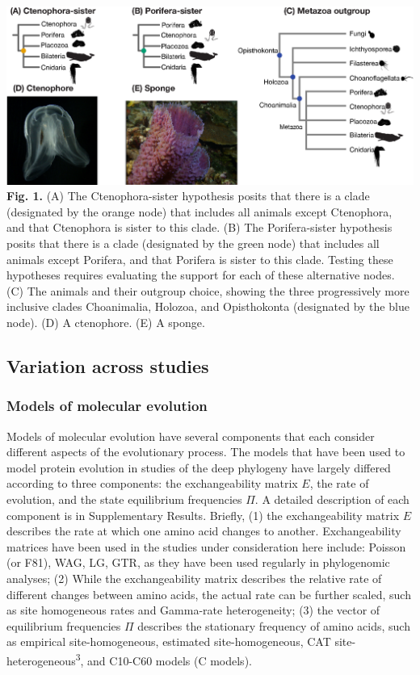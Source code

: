 \documentclass[]{article}
\begin{document}
\includegraphics{figures/Figure_overview.png} \textbf{Fig. 1.} (A) The
Ctenophora-sister hypothesis posits that there is a clade (designated by
the orange node) that includes all animals except Ctenophora, and that
Ctenophora is sister to this clade. (B) The Porifera-sister hypothesis
posits that there is a clade (designated by the green node) that
includes all animals except Porifera, and that Porifera is sister to
this clade. Testing these hypotheses requires evaluating the support for
each of these alternative nodes. (C) The animals and their outgroup
choice, showing the three progressively more inclusive clades
Choanimalia, Holozoa, and Opisthokonta (designated by the blue node).
(D) A ctenophore. (E) A sponge.

\hypertarget{variation-across-studies}{%
\subsection{Variation across studies}\label{variation-across-studies}}

\hypertarget{models-of-molecular-evolution}{%
\subsubsection{Models of molecular
evolution}\label{models-of-molecular-evolution}}

Models of molecular evolution have several components that each consider
different aspects of the evolutionary process. The models that have been
used to model protein evolution in studies of the deep phylogeny have
largely differed according to three components: the exchangeability
matrix \(E\), the rate of evolution, and the state equilibrium
frequencies \(\Pi\). A detailed description of each component is in
Supplementary Results. Briefly, (1) the exchangeability matrix \(E\)
describes the rate at which one amino acid changes to another.
Exchangeability matrices have been used in the studies under
consideration here include: Poisson (or F81), WAG, LG, GTR, as they have
been used regularly in phylogenomic analyses; (2) While the
exchangeability matrix describes the relative rate of different changes
between amino acids, the actual rate can be further scaled, such as site
homogeneous rates and Gamma-rate heterogeneity; (3) the vector of
equilibrium frequencies \(\Pi\) describes the stationary frequency of
amino acids, such as empirical site-homogeneous, estimated
site-homogeneous, CAT site-heterogeneous\textsuperscript{3}, and C10-C60
models (C models).
\end{document}
